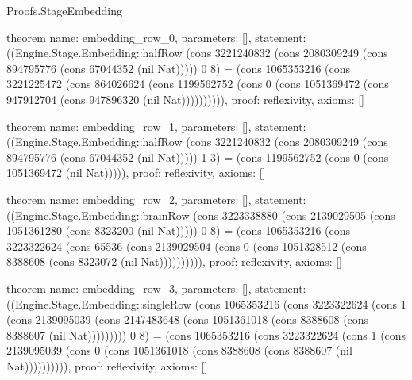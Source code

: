 \begin{lexlean}{Proofs.StageEmbedding}
\begin{semanticmodule}
theorem{
  name: embedding_row_0,
  parameters: [],
  statement: ((Engine.Stage.Embedding::halfRow (cons 3221240832 (cons 2080309249 (cons 894795776 (cons 67044352 (nil Nat))))) 0 8) = (cons 1065353216 (cons 3221225472 (cons 864026624 (cons 1199562752 (cons 0 (cons 1051369472 (cons 947912704 (cons 947896320 (nil Nat)))))))))),
  proof: reflexivity{},
  axioms: []
}

theorem{
  name: embedding_row_1,
  parameters: [],
  statement: ((Engine.Stage.Embedding::halfRow (cons 3221240832 (cons 2080309249 (cons 894795776 (cons 67044352 (nil Nat))))) 1 3) = (cons 1199562752 (cons 0 (cons 1051369472 (nil Nat))))),
  proof: reflexivity{},
  axioms: []
}

theorem{
  name: embedding_row_2,
  parameters: [],
  statement: ((Engine.Stage.Embedding::brainRow (cons 3223338880 (cons 2139029505 (cons 1051361280 (cons 8323200 (nil Nat))))) 0 8) = (cons 1065353216 (cons 3223322624 (cons 65536 (cons 2139029504 (cons 0 (cons 1051328512 (cons 8388608 (cons 8323072 (nil Nat)))))))))),
  proof: reflexivity{},
  axioms: []
}

theorem{
  name: embedding_row_3,
  parameters: [],
  statement: ((Engine.Stage.Embedding::singleRow (cons 1065353216 (cons 3223322624 (cons 1 (cons 2139095039 (cons 2147483648 (cons 1051361018 (cons 8388608 (cons 8388607 (nil Nat))))))))) 0 8) = (cons 1065353216 (cons 3223322624 (cons 1 (cons 2139095039 (cons 0 (cons 1051361018 (cons 8388608 (cons 8388607 (nil Nat)))))))))),
  proof: reflexivity{},
  axioms: []
}
\end{semanticmodule}
\end{lexlean}
